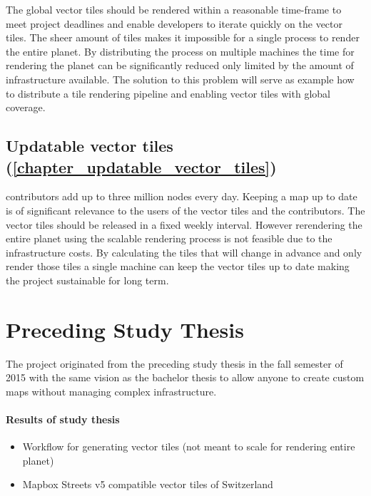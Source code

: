 The global vector tiles should be rendered within a reasonable time-frame
to meet project deadlines and enable developers to iterate quickly on the vector tiles.
The sheer amount of tiles makes it impossible for a single process to render the entire planet.
By distributing the process on multiple machines the time for rendering the planet can be significantly reduced only limited
by the amount of infrastructure available. The solution to this problem will serve as example how to distribute a tile rendering pipeline and enabling
vector tiles with global coverage.

\subsection*{Updatable vector tiles (\autoref{chapter_updatable_vector_tiles})}\label{intro_scalable_rendering_process}

\osm{} contributors add up to three million nodes every day\cite{osm_wiki_2016}. Keeping a map up to date is of significant relevance to the users of the vector tiles and the contributors. The vector tiles should be released in a fixed weekly interval.
However rerendering the entire planet using the scalable rendering process is not feasible due to the infrastructure costs. By calculating the tiles that will change in advance and only render those tiles a single machine can keep the vector tiles up to date making the project sustainable for long term.

\section{Preceding Study Thesis}\label{part1_scope_of_study_thesis}

The \osmvt{} project originated from the preceding study thesis in the fall semester of 2015 with the same vision as the bachelor thesis to allow anyone to create custom \osm{} maps without managing complex infrastructure. 

\paragraph{Results of study thesis}
\begin{itemize}
    \item Workflow for generating vector tiles (not meant to scale for rendering entire planet)
    \item Mapbox Streets v5 compatible vector tiles of Switzerland
\end{itemize}

